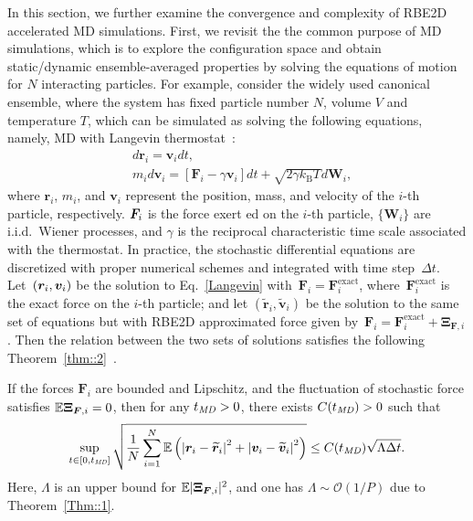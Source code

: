 In this section, we further examine the convergence and complexity of RBE2D accelerated MD simulations. 
First, we revisit the the common purpose of MD simulations, which is to explore the configuration space and obtain static/dynamic ensemble-averaged properties by solving the equations of motion for $N$ interacting particles.
For example, consider the widely used canonical ensemble, where the system has fixed particle number $N$, volume $V$ and temperature $T$, which can be simulated as solving the following equations, namely, MD with Langevin thermostat~\cite{frenkel2023understanding}:
\begin{equation}\label{Langevin}
    \begin{aligned}
        & d \bm{r}_i=\bm{v}_i d t, \\
        & m_i d \bm{v}_i=\left[\bm{F}_i-\gamma \bm{v}_i\right] d t+\sqrt{2 \gamma k_{\mathrm{B}} T} d \bm{W}_i,
    \end{aligned}
\end{equation}
where $\bm{r}_i$, $m_i$, and $\bm{v}_i$ represent the position, mass, and velocity of the $i$-th particle, respectively. $\boldsymbol{F}_i$ is the force exert {ed} on the $i$-th particle, $\{\bm{W}_i\}$ are i.i.d.~Wiener processes, and $\gamma$ is the reciprocal characteristic time scale associated with the thermostat.
In practice, the stochastic differential equations are discretized with proper numerical schemes and integrated with time step~$\Delta t$.
Let~$(\boldsymbol{r}_i, \boldsymbol{v}_i)$ be the solution to Eq.~\eqref{Langevin} with~$\bm{F}_i = \bm{F}^{\text{exact}}_i$, where~$\bm{F}^{\text{exact}}_i$ is the exact force on the $i$-th particle; and let $(\widetilde{\bm{r}}_i,\widetilde{\bm{v}}_i)$ be the solution to the same set of equations but with RBE2D approximated force given by~$\bm{F}_i = \bm{F}^{\text{exact}}_i + \bm{\Xi}_{\bm{F},i}$.
Then the relation between the two sets of solutions satisfies the following Theorem~\ref{thm::2}~\cite{jin2021convergence}.

\begin{thm}\label{thm::2}
If the forces $\bm{F}_i$ are bounded and Lipschitz, and the fluctuation of stochastic force satisfies $\mathbb{E}\boldsymbol{\Xi}_{\boldsymbol{F},i}=0$, then for any $t_{\emph{MD}}>0$, there exists $C(t_{\emph{MD}})>0$ such that
\begin{equation}\label{eq::Convergence}
\sup _{t \in[0, t_{\emph{MD}}]} \sqrt{\frac{1}{N} \sum_{i=1}^N \mathbb{E}\left(\left|\bm{r}_i-\widetilde{\bm{r}}_i\right|^2+\left|\bm{v}_i-\widetilde{\bm{v}}_i\right|^2\right)} \leq C(t_{\emph{MD}}) \sqrt{\Lambda \Delta t}. %
\end{equation}
 {Here, $\Lambda$ is an upper bound for $\mathbb{E}|\boldsymbol{\Xi}_{\boldsymbol{F},i}|^2$, and one has $\Lambda\sim \mathcal O(1/P)$ due to Theorem~\ref{Thm::1}.} 
\end{thm}

